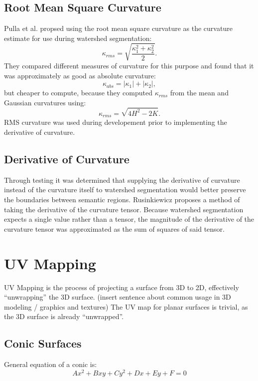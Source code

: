 \subsection{Root Mean Square Curvature}
Pulla et al. propsed using the root mean square curvature as the curvature estimate for use during watershed segmentation:
\begin{equation}
	\kappa_{rms} = \sqrt{\frac{\kappa_1^2 + \kappa_2^2}{2}}.
\end{equation}
They compared different measures of curvature for this purpose and found that it was approximately as good as absolute curvature:
\begin{equation}
	\kappa_{abs} = |\kappa_1| + |\kappa_2|,
\end{equation}
but cheaper to compute, because they computed $\kappa_{rms}$ from the mean and Gaussian curvatures using:
\begin{equation}
	\kappa_{rms} = \sqrt{4H^2 - 2K}.
\end{equation}
RMS curvature was used during developement prior to implementing the derivative of curvature.

\subsection{Derivative of Curvature}
Through testing it was determined that supplying the derivative of curvature instead of the curvature itself to watershed segmentation would better preserve the boundaries between semantic regions.
Rusinkiewicz proposes a method of taking the derivative of the curvature tensor\cite{SRTensor}.
Because watershed segmentation expects a single value rather than a tensor, the magnitude of the derivative of the curvature tensor was approximated as the sum of squares of said tensor.

\section{UV Mapping}
UV Mapping is the process of projecting a surface from 3D to 2D, effectively ``unwrapping'' the 3D surface.
(insert sentence about common usage in 3D modeling / graphics and textures)
The UV map for planar surfaces is trivial, as the 3D surface is already ``unwrapped''.

\subsection{Conic Surfaces}
General equation of a conic is:
\begin{equation}\label{eq:gen_conic}
	Ax^2 + Bxy + Cy^2 + Dx + Ey + F = 0
\end{equation}

